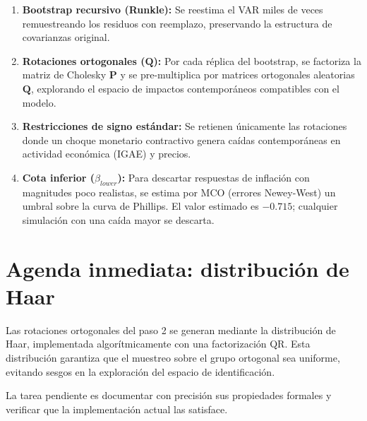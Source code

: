 \documentclass[11pt,a4paper]{article}
\begin{document}
\begin{enumerate}
    \item \textbf{Bootstrap recursivo (Runkle):} Se reestima el VAR miles de veces remuestreando los residuos con reemplazo, preservando la estructura de covarianzas original.

    \item \textbf{Rotaciones ortogonales ($\mathbf{Q}$):} Por cada réplica del bootstrap, se factoriza la matriz de Cholesky $\mathbf{P}$ y se pre-multiplica por matrices ortogonales aleatorias $\mathbf{Q}$, explorando el espacio de impactos contemporáneos compatibles con el modelo.

    \item \textbf{Restricciones de signo estándar:} Se retienen únicamente las rotaciones donde un choque monetario contractivo genera caídas contemporáneas en actividad económica (IGAE) y precios.

    \item \textbf{Cota inferior ($\beta_{lower}$):} Para descartar respuestas de inflación con magnitudes poco realistas, se estima por MCO (errores Newey-West) un umbral sobre la curva de Phillips. El valor estimado es $-0.715$; cualquier simulación con una caída mayor se descarta.
\end{enumerate}

\section{Agenda inmediata: distribución de Haar}
Las rotaciones ortogonales del paso 2 se generan mediante la distribución de Haar, implementada algorítmicamente con una factorización QR. Esta distribución garantiza que el muestreo sobre el grupo ortogonal sea uniforme, evitando sesgos en la exploración del espacio de identificación.

La tarea pendiente es documentar con precisión sus propiedades formales y verificar que la implementación actual las satisface.
\end{document}
